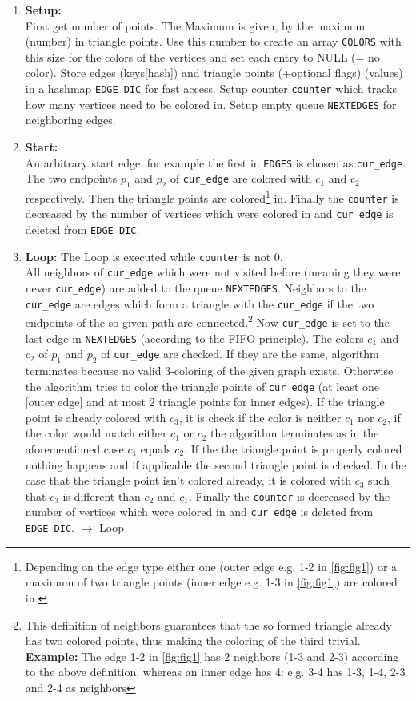 \documentclass[english]{scrartcl}
\newcommand{\code}{\texttt}
\begin{document}
\begin{enumerate}
    \item \textbf{Setup:}\\ First get number of points. The Maximum is given, by the maximum (number) in triangle points. Use this number to create an array \code{COLORS} with this size for the colors of the vertices and set each entry to NULL (= no color). Store edges (keys[hash]) and triangle points (+optional flags) (values) in a hashmap \code{EDGE\_DIC} for fast access. Setup counter \code{counter} which tracks how many vertices need to be colored in. Setup empty queue \code{NEXTEDGES} for neighboring edges.
    \item \textbf{Start:}\\ An arbitrary start edge, for example the first in \code{EDGES} is chosen as \code{cur\_edge}. The two endpoints $p_1$ and $p_2$ of \code{cur\_edge} are colored with $c_1$ and $c_2$ respectively. Then the triangle points are colored\footnote{Depending on the edge type either one (outer edge e.g. 1-2 in \autoref{fig:fig1}) or a maximum of two triangle points (inner edge e.g. 1-3 in \autoref{fig:fig1}) are colored in.} in. Finally the \code{counter} is decreased by the number of vertices which were colored in and \code{cur\_edge} is deleted from \code{EDGE\_DIC}.  
    \item \textbf{Loop:} The Loop is executed while \code{counter} is not 0. \\ All neighbors of \code{cur\_edge} which were not visited before (meaning they were never \code{cur\_edge}) are added to the queue \code{NEXTEDGES}. Neighbors to the \code{cur\_edge} are edges which form a triangle with the \code{cur\_edge} if the two endpoints of the so given path are connected.\footnote{This definition of neighbors guarantees that the so formed triangle already has two colored points, thus making the coloring of the third trivial. \\ \textbf{Example:} The edge 1-2 in \autoref{fig:fig1} has 2 neighbors (1-3 and 2-3) according to the above definition, whereas an inner edge has 4: e.g. 3-4 has 1-3, 1-4, 2-3 and 2-4 as neighbors} 
    Now \code{cur\_edge} is set to the last edge in \code{NEXTEDGES} (according to the FIFO-principle). %
    The colors $c_1$ and $c_2$ of $p_1$ and $p_2$ of \code{cur\_edge} are checked. If they are the same, algorithm terminates because no valid 3-coloring of the given graph exists. Otherwise the algorithm tries to color the triangle points of \code{cur\_edge} (at least one [outer edge] and at most 2 triangle points for inner edges). If the triangle point is already colored with $c_3$, it is check if the color is neither $c_1$ nor $c_2$, if the color would match either $c_1$ or $c_2$ the algorithm terminates as in the aforementioned case $c_1$ equals $c_2$. If the the triangle point is properly colored nothing happens and if applicable the second triangle point is checked. In the case that the triangle point isn't colored already, it is colored with $c_3$ such that $c_3$ is different than $c_2$ and $c_1$. Finally the \code{counter} is decreased by the number of vertices which were colored in and \code{cur\_edge} is deleted from \code{EDGE\_DIC}. $\rightarrow$ Loop

\end{enumerate}
\end{document}
